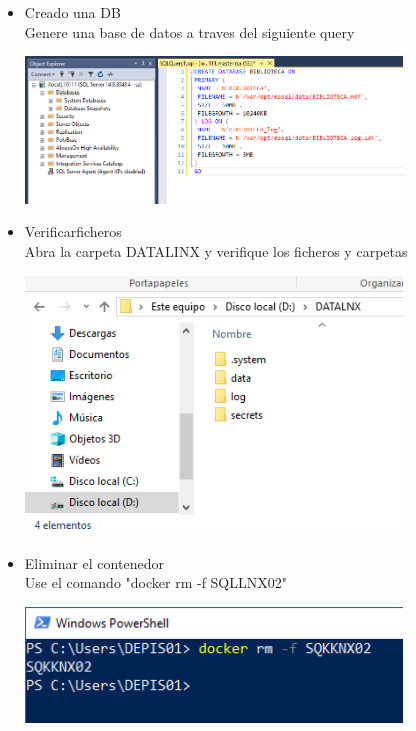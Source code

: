 \begin{itemize}
	\item Creado una DB
	\\Genere una base de datos a traves del siguiente query

	\begin{center}
	\includegraphics[width=10cm]{./Imagenes/19} 
	\end{center}

\end{itemize} 


\begin{itemize}
	\item Verificarficheros
	\\Abra la carpeta DATALINX y verifique los ficheros y carpetas

	\begin{center}
	\includegraphics[width=10cm]{./Imagenes/20} 
	\end{center}

\end{itemize} 

\begin{itemize}
	\item Eliminar el contenedor
	\\Use el comando "docker rm -f SQLLNX02"

	\begin{center}
	\includegraphics[width=10cm]{./Imagenes/21} 
	\end{center}

\end{itemize} 


